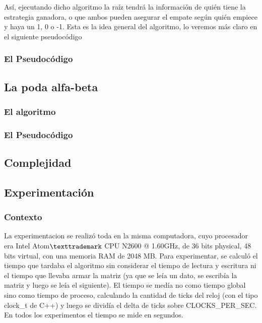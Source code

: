 \documentclass[A4paper,oneside,fleqn,11pt]{article}
\theoremstyle{definition}
\begin{document}
Así, ejecutando dicho algoritmo la raíz tendrá la información de quién tiene la estrategia ganadora, o que ambos pueden asegurar el empate según quién empiece y haya un 1, 0 o -1. Esta es la idea general del algoritmo, lo veremos más claro en el siguiente pseudocódigo

\subsubsection{El Pseudocódigo}


\subsection{La poda alfa-beta}


\subsubsection{El algoritmo}

\subsubsection{El Pseudocódigo}



\subsection{Complejidad}





\subsection{Experimentación}

\subsubsection{Contexto} 


La experimentacion se realizó toda en la misma computadora, cuyo procesador era Intel Atom$\texttrademark$ CPU N2600 @ 1.60GHz, de 36 bits physical, 48 bits virtual, con una memoria RAM de 2048 MB.  Para experimentar, se calculó el tiempo que tardaba el algoritmo sin considerar el tiempo de lectura y escritura ni el tiempo que llevaba armar la matriz (ya que se leía un dato, se escribía la matriz y luego se leía el siguiente). 
El tiempo se medía no como tiempo global sino como tiempo de proceso, calculando la cantidad de ticks del reloj (con el tipo clock\_t de C++) y luego se dividía el delta de ticks sobre CLOCKS\_PER\_SEC. En todos los experimentos el tiempo se mide en segundos. 
\end{document}
